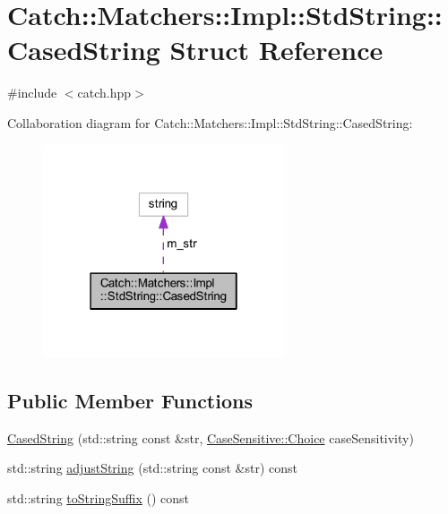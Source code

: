 \hypertarget{struct_catch_1_1_matchers_1_1_impl_1_1_std_string_1_1_cased_string}{}\section{Catch\+:\+:Matchers\+:\+:Impl\+:\+:Std\+String\+:\+:Cased\+String Struct Reference}
\label{struct_catch_1_1_matchers_1_1_impl_1_1_std_string_1_1_cased_string}


{\ttfamily \#include $<$catch.\+hpp$>$}



Collaboration diagram for Catch\+:\+:Matchers\+:\+:Impl\+:\+:Std\+String\+:\+:Cased\+String\+:\nopagebreak
\begin{figure}[H]
\begin{center}
\leavevmode
\includegraphics[width=202pt]{struct_catch_1_1_matchers_1_1_impl_1_1_std_string_1_1_cased_string__coll__graph}
\end{center}
\end{figure}
\subsection*{Public Member Functions}
\begin{DoxyCompactItemize}
\item 
\hyperlink{struct_catch_1_1_matchers_1_1_impl_1_1_std_string_1_1_cased_string_aebd017c88423d8a11c62cff85754a22d}{Cased\+String} (std\+::string const \&str, \hyperlink{struct_catch_1_1_case_sensitive_aad49d3aee2d97066642fffa919685c6a}{Case\+Sensitive\+::\+Choice} case\+Sensitivity)
\item 
std\+::string \hyperlink{struct_catch_1_1_matchers_1_1_impl_1_1_std_string_1_1_cased_string_a8117fdcee8fd8a8e5001b38e0bd19848}{adjust\+String} (std\+::string const \&str) const
\item 
std\+::string \hyperlink{struct_catch_1_1_matchers_1_1_impl_1_1_std_string_1_1_cased_string_ac12f719f5d1aeb28a2bc2f6cc8b95b37}{to\+String\+Suffix} () const
\end{DoxyCompactItemize}
